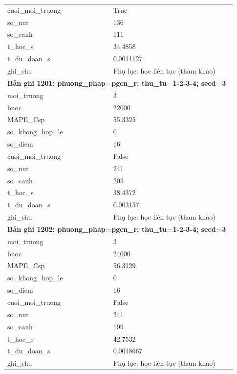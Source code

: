 \begin{longtable}{p{0.43\linewidth}p{0.50\linewidth}}
cuoi\_\allowbreak moi\_\allowbreak truong & True \\
so\_\allowbreak nut & 136 \\
so\_\allowbreak canh & 111 \\
t\_\allowbreak hoc\_\allowbreak s & 34.4858 \\
t\_\allowbreak du\_\allowbreak doan\_\allowbreak s & 0.0011127 \\
ghi\_\allowbreak chu & Phụ lục: học liên tục (tham khảo) \\
\midrule
\multicolumn{2}{p{0.95\linewidth}}{\textbf{Bản ghi 1201: phuong\_phap=pgcn\_r; thu\_tu=1-2-3-4; seed=3}} \\
moi\_\allowbreak truong & 3 \\
buoc & 22000 \\
MAPE\_\allowbreak Csp & 55.3325 \\
so\_\allowbreak khong\_\allowbreak hop\_\allowbreak le & 0 \\
so\_\allowbreak diem & 16 \\
cuoi\_\allowbreak moi\_\allowbreak truong & False \\
so\_\allowbreak nut & 241 \\
so\_\allowbreak canh & 205 \\
t\_\allowbreak hoc\_\allowbreak s & 38.4372 \\
t\_\allowbreak du\_\allowbreak doan\_\allowbreak s & 0.003157 \\
ghi\_\allowbreak chu & Phụ lục: học liên tục (tham khảo) \\
\midrule
\multicolumn{2}{p{0.95\linewidth}}{\textbf{Bản ghi 1202: phuong\_phap=pgcn\_r; thu\_tu=1-2-3-4; seed=3}} \\
moi\_\allowbreak truong & 3 \\
buoc & 24000 \\
MAPE\_\allowbreak Csp & 56.3129 \\
so\_\allowbreak khong\_\allowbreak hop\_\allowbreak le & 0 \\
so\_\allowbreak diem & 16 \\
cuoi\_\allowbreak moi\_\allowbreak truong & False \\
so\_\allowbreak nut & 241 \\
so\_\allowbreak canh & 199 \\
t\_\allowbreak hoc\_\allowbreak s & 42.7532 \\
t\_\allowbreak du\_\allowbreak doan\_\allowbreak s & 0.0018667 \\
ghi\_\allowbreak chu & Phụ lục: học liên tục (tham khảo) \\

\end{longtable}

